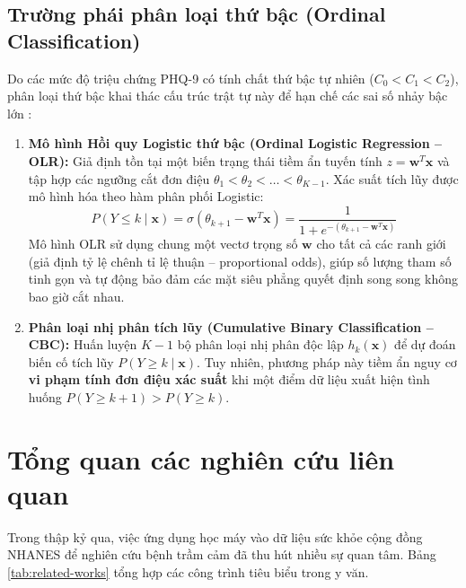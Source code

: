 \subsection{Trường phái phân loại thứ bậc (Ordinal Classification)}
\label{subsec:ordinal-paradigm}

Do các mức độ triệu chứng PHQ-9 có tính chất thứ bậc tự nhiên ($C_0 < C_1 < C_2$), phân loại thứ bậc khai thác cấu trúc trật tự này để hạn chế các sai số nhảy bậc lớn \cite{mccullagh1980regression, frank2001simple}:
\begin{enumerate}
    \item \textbf{Mô hình Hồi quy Logistic thứ bậc (Ordinal Logistic Regression -- OLR):} Giả định tồn tại một biến trạng thái tiềm ẩn tuyến tính $z = \mathbf{w}^T \mathbf{x}$ và tập hợp các ngưỡng cắt đơn điệu $\theta_1 < \theta_2 < \dots < \theta_{K-1}$. Xác suất tích lũy được mô hình hóa theo hàm phân phối Logistic:
    \begin{equation}
        P(Y \le k \mid \mathbf{x}) = \sigma(\theta_{k+1} - \mathbf{w}^T \mathbf{x}) = \frac{1}{1 + e^{-(\theta_{k+1} - \mathbf{w}^T \mathbf{x})}}
    \end{equation}
    Mô hình OLR sử dụng chung một vectơ trọng số $\mathbf{w}$ cho tất cả các ranh giới (giả định tỷ lệ chênh tỉ lệ thuận -- proportional odds), giúp số lượng tham số tinh gọn và tự động bảo đảm các mặt siêu phẳng quyết định song song không bao giờ cắt nhau.
    \item \textbf{Phân loại nhị phân tích lũy (Cumulative Binary Classification -- CBC):} Huấn luyện $K-1$ bộ phân loại nhị phân độc lập $h_k(\mathbf{x})$ để dự đoán biến cố tích lũy $P(Y \ge k \mid \mathbf{x})$. Tuy nhiên, phương pháp này tiềm ẩn nguy cơ \textbf{vi phạm tính đơn điệu xác suất} khi một điểm dữ liệu xuất hiện tình huống $P(Y \ge k+1) > P(Y \ge k)$.
\end{enumerate}

\section{Tổng quan các nghiên cứu liên quan}
\label{sec:nghien-cuu-lien-quan}

Trong thập kỷ qua, việc ứng dụng học máy vào dữ liệu sức khỏe cộng đồng NHANES để nghiên cứu bệnh trầm cảm đã thu hút nhiều sự quan tâm. Bảng \ref{tab:related-works} tổng hợp các công trình tiêu biểu trong y văn.

